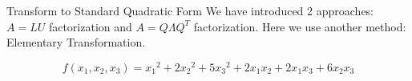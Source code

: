 \documentclass{beamer}
\begin{document}
\begin{frame}{Transform to Standard Quadratic Form}
We have introduced 2 approaches: $A=LU$ factorization and $A=Q\varLambda Q^T$ factorization. Here we use another method: Elementary Transformation.

\begin{equation*}
    f\left( x_1, x_2, x_3 \right) ={x_1}^2+2{x_2}^2+5{x_3}^2+2x_1x_2+2x_1x_3+6x_2x_3
\end{equation*}

\end{frame}
\end{document}
